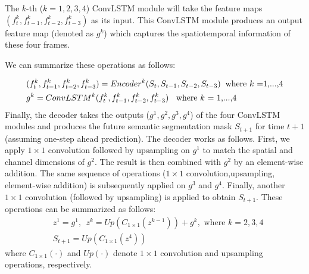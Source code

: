 \documentclass{bmvc2k}
\begin{document}
The $k$-th ($k=1,2,3,4$) ConvLSTM module will take the feature maps $(f_{t}^k,f_{t-1}^k,f_{t-2}^k,f_{t-3}^k)$ as its input. This ConvLSTM module produces an output feature map (denoted as $g^{k}$) which captures the spatiotemporal information of these four frames. 

We can summarize these operations as follows: 

\begin{equation}\label{eq:overview}
\begin{aligned}
& (f^{k}_{t},f^{k}_{t-1},f^{k}_{t-2},f^{k}_{t-3}) = Encoder^{k}(S_{t}, S_{t-1}, S_{t-2}, S_{t-3}) \hspace{0.2cm} \text{where $k$ =1,...,4}\\
& g^{k} = ConvLSTM^{k}(f^{k}_{t},f^{k}_{t-1},f^{k}_{t-2},f^{k}_{t-3}) \hspace{0.2cm} \text{ where $k$ = 1,...,4}\\
\end{aligned}
\end{equation}%
Finally, the decoder takes the outputs ($g^{1}, g^{2}, g^{3}, g^{4}$) of the four ConvLSTM modules and produces the future semantic segmentation mask $S_{t+1}$ for time $t+1$ (assuming one-step ahead prediction). The decoder works as follows. First, we apply $1\times 1$ convolution followed by upsampling on $g^{1}$ to match the spatial and channel dimensions of $g^{2}$. The result is then combined with $g^{2}$ by an element-wise addition. The same sequence of operations ($1\times 1$ convolution,upsampling, element-wise addition) is subsequently applied on $g^{3}$ and $g^{4}$. Finally, another $1\times 1$ convolution (followed by upsampling) is applied to obtain $S_{t+1}$. These operations can be summarized as follows:
\begin{equation}
  \begin{aligned}
  & z^{1}=g^{1}, \ \  z^{k}=Up(C_{1\times 1}(z^{k-1}))+g^{k}, \textrm{ where } k=2,3,4\\
    & S_{t+1}=Up(C_{1\times 1}(z^{4}))
    \end{aligned}
\end{equation}
where $C_{1\times 1}(\cdot)$ and $Up(\cdot)$ denote $1\times 1$ convolution and upsampling operations, respectively.
\end{document}
